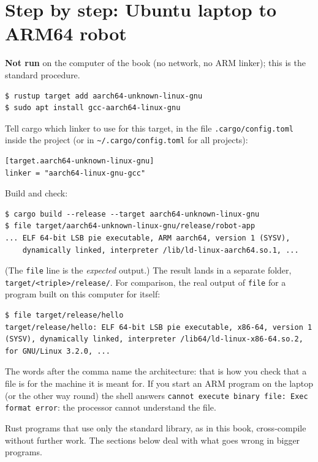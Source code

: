 \section*{Step by step: Ubuntu laptop to ARM64 robot}
\textbf{Not run} on the computer of the book (no network, no ARM linker); this is the standard procedure.
\begin{verbatim}
$ rustup target add aarch64-unknown-linux-gnu
$ sudo apt install gcc-aarch64-linux-gnu
\end{verbatim}
Tell cargo which linker to use for this target, in the file \verb!.cargo/config.toml! inside the project (or in \verb!~/.cargo/config.toml! for all projects):
\begin{verbatim}
[target.aarch64-unknown-linux-gnu]
linker = "aarch64-linux-gnu-gcc"
\end{verbatim}
Build and check:
\begin{verbatim}
$ cargo build --release --target aarch64-unknown-linux-gnu
$ file target/aarch64-unknown-linux-gnu/release/robot-app
... ELF 64-bit LSB pie executable, ARM aarch64, version 1 (SYSV),
    dynamically linked, interpreter /lib/ld-linux-aarch64.so.1, ...
\end{verbatim}
(The \verb!file! line is the \emph{expected} output.) The result lands in a separate folder, \verb!target/<triple>/release/!. For comparison, the real output of \verb!file! for a program built on this computer for itself:
\begin{verbatim}
$ file target/release/hello
target/release/hello: ELF 64-bit LSB pie executable, x86-64, version 1
(SYSV), dynamically linked, interpreter /lib64/ld-linux-x86-64.so.2,
for GNU/Linux 3.2.0, ...
\end{verbatim}
The words after the comma name the architecture: that is how you check that a file is for the machine it is meant for. If you start an ARM program on the laptop (or the other way round) the shell answers \verb!cannot execute binary file: Exec format error!: the processor cannot understand the file.

Rust programs that use only the standard library, as in this book, cross-compile without further work. The sections below deal with what goes wrong in bigger programs.

